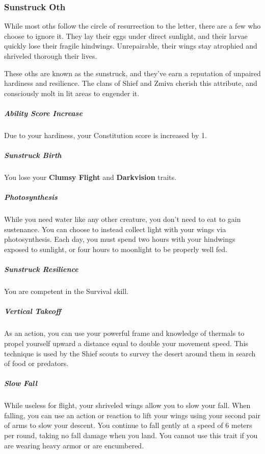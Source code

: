 \subsubsection{Sunstruck Oth}
    While most oths follow the circle of resurrection to the letter, there are a few who choose to ignore it.
    They lay their eggs under direct sunlight, and their larvae quickly lose their fragile hindwings.
    Unrepairable, their wings stay atrophied and shriveled thorough their lives.

    These oths are known as the sunstruck, and they've earn a reputation of unpaired hardiness and resilience.
    The clans of Shief and Zmiva cherish this attribute, and consciously molt in lit areas to engender it.

    \subparagraph{Ability Score Increase} Due to your hardiness, your Constitution score is increased by 1.

    \subparagraph{Sunstruck Birth} You lose your \textbf{Clumsy Flight} and \textbf{Darkvision} traits.

    \subparagraph{Photosynthesis} While you need water like any other creature, you don't need to eat to gain sustenance.
    You can choose to instead collect light with your wings via photosynthesis.
    Each day, you must spend two hours with your hindwings exposed to sunlight, or four hours to moonlight to be properly well fed.

    \subparagraph{Sunstruck Resilience} You are competent in the Survival skill.

    \subparagraph{Vertical Takeoff} As an action, you can use your powerful frame and knowledge of thermals to propel yourself upward a distance equal to double your movement speed.
    This technique is used by the Shief scouts to survey the desert around them in search of food or predators.

    \subparagraph{Slow Fall} While useless for flight, your shriveled wings allow you to slow your fall.
    When falling, you can use an action or reaction to lift your wings using your second pair of arms to slow your descent.
    You continue to fall gently at a speed of 6 meters per round, taking no fall damage when you land.
    You cannot use this trait if you are wearing heavy armor or are encumbered.

\newpage
